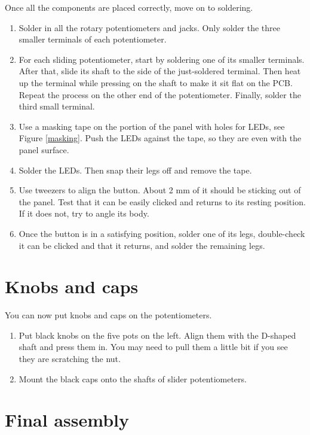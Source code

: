\documentclass[10pt,a4paper,twocolumn]{article}
\begin{document}
\clearpage

Once all the components are placed correctly, move on to soldering.

\begin{enumerate}
  \item Solder in all the rotary potentiometers and jacks. Only solder the three
    smaller terminals of each potentiometer.
  \item For each sliding potentiometer, start by soldering one of its smaller
    terminals. After that, slide its shaft to the side of the just-soldered
    terminal. Then heat up the terminal while pressing on the shaft to make it
    sit flat on the PCB. Repeat the process on the other end of the
    potentiometer. Finally, solder the third small terminal.
  \item Use a masking tape on the portion of the panel with holes for LEDs, see
    Figure \ref{masking}. Push the LEDs against the tape, so they are even with
    the panel surface.
  \item Solder the LEDs. Then snap their legs off and remove the tape.
  \item Use tweezers to align the button. About 2 mm of it should be
    sticking out of the panel. Test that it can be easily clicked and
    returns to its resting position. If it does not, try to angle its body.
  \item Once the button is in a satisfying position, solder one of its legs,
    double-check it can be clicked and that it returns, and solder the remaining
    legs.
\end{enumerate}

\section{Knobs and caps}

You can now put knobs and caps on the potentiometers.

\begin{enumerate}
  \item Put black knobs on the five pots on the left. Align them with the
    D-shaped shaft and press them in. You may need to pull them a little bit if
    you see they are scratching the nut.
  \item Mount the black caps onto the shafts of slider potentiometers.
\end{enumerate}

\section{Final assembly}
\end{document}

